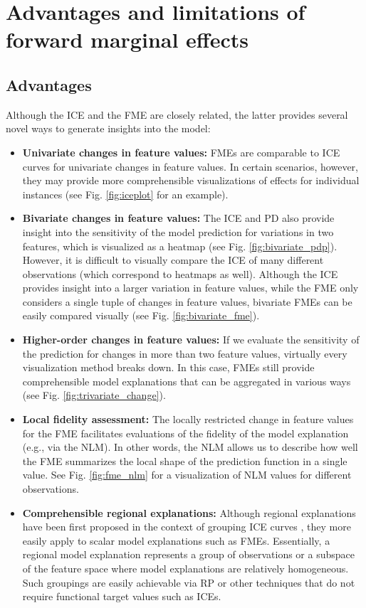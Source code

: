 \section{Advantages and limitations of forward marginal effects}

\subsection{Advantages}

Although the ICE and the FME are closely related, the latter provides several novel ways to generate insights into the model:

\begin{itemize}
    \item \textbf{Univariate changes in feature values:} FMEs are comparable to ICE curves for univariate changes in feature values. In certain scenarios, however, they may provide more comprehensible visualizations of effects for individual instances (see Fig. \ref{fig:iceplot} for an example). 
    \item \textbf{Bivariate changes in feature values:} The ICE and PD also provide insight into the sensitivity of the model prediction for variations in two features, which is visualized as a heatmap (see Fig. \ref{fig:bivariate_pdp}). However, it is difficult to visually compare the ICE of many different observations (which correspond to heatmaps as well). Although the ICE provides insight into a larger variation in feature values, while the FME only considers a single tuple of changes in feature values, bivariate FMEs can be easily compared visually (see Fig. \ref{fig:bivariate_fme}).
    \item \textbf{Higher-order changes in feature values:} If we evaluate the sensitivity of the prediction for changes in more than two feature values, virtually every visualization method breaks down. In this case, FMEs still provide comprehensible model explanations that can be aggregated in various ways (see Fig. \ref{fig:trivariate_change}).
    \item \textbf{Local fidelity assessment:}
    The locally restricted change in feature values for the FME facilitates evaluations of the fidelity of the model explanation (e.g., via the NLM). In other words, the NLM allows us to describe how well the FME summarizes the local shape of the prediction function in a single value. See Fig. \ref{fig:fme_nlm} for a visualization of NLM values for different observations.
    \item \textbf{Comprehensible regional explanations:} Although regional explanations have been first proposed in the context of grouping ICE curves \citep{herbinger_repid, britton_vine}, they more easily apply to scalar model explanations such as FMEs. Essentially, a regional model explanation represents a group of observations or a subspace of the feature space where model explanations are relatively homogeneous. Such groupings are easily achievable via RP or other techniques that do not require functional target values such as ICEs.

\end{itemize}
